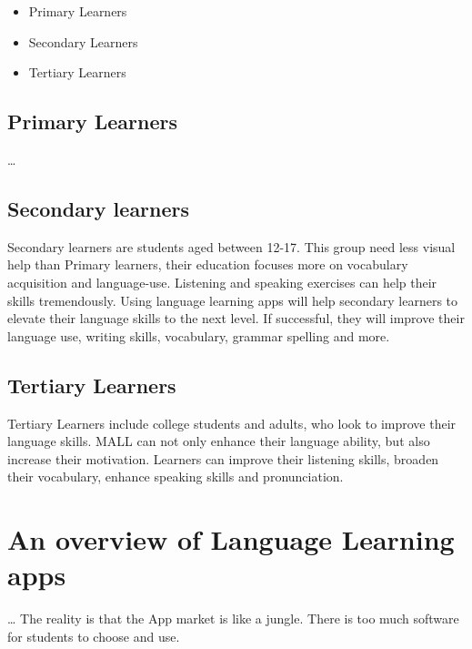 \documentclass[10pt,english,a4paper]{article}
\begin{document}
\begin{itemize}
    \item Primary Learners
    \item Secondary Learners
    \item Tertiary Learners
\end{itemize}

\subsection{Primary Learners} 

\ldots

\subsection{Secondary learners}

Secondary learners are students aged between 12-17. This group need less visual help than Primary learners, their education focuses more on vocabulary acquisition and language-use. Listening and speaking exercises can help their skills tremendously. Using language learning apps will help secondary learners to elevate their language skills to the next level. If successful, they will improve their language use, writing skills, vocabulary, grammar spelling and more.

\subsection{Tertiary Learners}

Tertiary Learners include college students and adults, who look to improve their language skills. MALL can not only enhance their language ability, but also increase their motivation. Learners can improve their listening skills, broaden their vocabulary, enhance speaking skills and pronunciation.  \cite {franklin2011mobile}\cite {howard2017any}\cite {miangah2012mobile}



\section{An overview of Language Learning apps}
\ldots
The reality is that the App market is like a jungle. There is too much software for students to choose and use.
\end{document}
